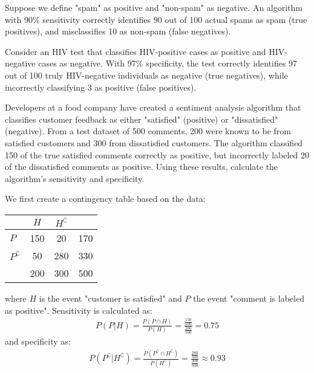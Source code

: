 \begin{exmp}
	Suppose we define "spam" as positive and "non-spam" as negative.
	An algorithm with 90\% sensitivity correctly identifies 90 out of 100 actual spams as spam (true positives), and misclassifies 10 as non-spam (false negatives).
\end{exmp}

\begin{exmp}
	Consider an HIV test that classifies HIV-positive cases as positive and HIV-negative cases as negative.
	With 97\% specificity, the test correctly identifies 97 out of 100 truly HIV-negative individuals as negative (true negatives),
	while incorrectly classifying 3 as positive (false positives).
\end{exmp}

\begin{exmp}
	Developers at a food company have created a sentiment analysis algorithm that classifies customer feedback as either "satisfied" (positive) or "dissatisfied" (negative).
	From a test dataset of 500 comments, 200 were known to be from satisfied customers and 300 from dissatisfied customers.
	The algorithm classified 150 of the true satisfied comments correctly as positive,
	but incorrectly labeled 20 of the dissatisfied comments as positive.
	Using these results, calculate the algorithm's sensitivity and specificity.
\end{exmp}
\begin{solution}
	We first create a contingency table based on the data:
	\begin{center}
	\begin{tabular}{l|cc|c}
						& \( H \) & \( H^\complement \) &  \\ \hline
	\( P \)                & 150 & 20 & 170\\ 
	\( P^\complement \)    & 50 & 280 & 330 \\ \hline
						& 200 & 300 & 500
	\end{tabular}
	\end{center}
	where \( H \) is the event "customer is satisfied" and \( P \) the event "comment is labeled as positive".
	Sensitivity is calculated as:
	\begin{gather*}
		P(P | H) = \frac{P(P \cap H)}{P(H)} = \frac{\frac{150}{500}}{\frac{200}{500}} = 0.75
	\end{gather*}
	and specificity as:
	\begin{gather*}
		P(P^\complement | H^\complement) = \frac{P(P^\complement \cap H^\complement)}{P(H^\complement)} = \frac{\frac{280}{500}}{\frac{300}{500}} \approx 0.93
	\end{gather*}
\end{solution}